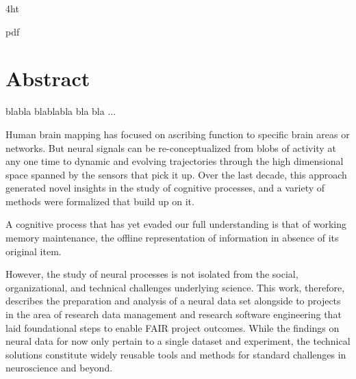 \documentclass[
  a4paper,  %
  twoside,  %
  bibliography=totoc,
  headsepline,
  cleardoublepage=empty,
  parskip=half,
  draft=false
]{scrbook}
\begin{document}
\iftex4ht
  \Configure{$}{\PicMath}{\EndPicMath}{}

  {pdf}
  {%
  }
\fi



\Titelblatt

\pagestyle{preamble}
\renewcommand*{\chapterpagestyle}{preamble}



\section*{Abstract}

blabla blablabla bla bla ...

Human brain mapping has focused on ascribing function to specific brain areas or networks.
But neural signals can be re-conceptualized from blobs of activity at any one time to dynamic and evolving trajectories through the high dimensional space spanned by the sensors that pick it up.
Over the last decade, this approach generated novel insights in the study of cognitive processes, and a variety of methods were formalized that build up on it.

A cognitive process that has yet evaded our full understanding is that of working memory maintenance, the offline representation of information in absence of its original item.

However, the study of neural processes is not isolated from the social, organizational, and technical challenges underlying science.
This work, therefore, describes the preparation and analysis of a neural data set alongside to projects in the area of research data management and research software engineering that laid foundational steps to enable FAIR project outcomes.
While the findings on neural data for now only pertain to a single dataset and experiment, the technical solutions constitute widely reusable tools and methods for standard challenges in neuroscience and beyond.
\end{document}
